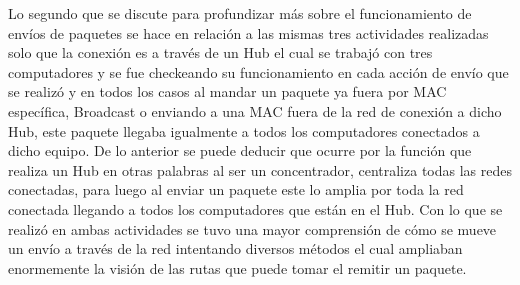 \documentclass[spanish]{udpreport}
\begin{document}
Lo segundo que se discute para profundizar más sobre el funcionamiento de envíos de paquetes se hace en relación a las mismas tres actividades realizadas solo que la conexión es a través de un Hub el cual se trabajó con tres computadores y se fue checkeando su funcionamiento en cada acción de envío que se realizó y en todos los casos al mandar un paquete ya fuera por MAC específica, Broadcast o enviando a una MAC fuera de la red de conexión a dicho Hub, este paquete llegaba igualmente a todos los computadores conectados a dicho equipo. De lo anterior se puede deducir que ocurre por la función que realiza un Hub en otras palabras al ser un concentrador, centraliza todas las redes conectadas, para luego al enviar un paquete este lo amplia por toda la red conectada llegando a todos los computadores que están en el Hub. 
Con lo que se realizó en ambas actividades se tuvo una mayor comprensión de cómo se mueve  un envío a través de la red intentando diversos métodos el cual ampliaban enormemente la visión de las rutas que puede tomar el remitir un paquete.
\end{document}

